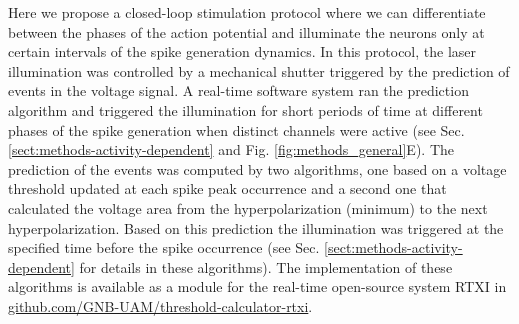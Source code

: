 Here we propose a closed-loop stimulation protocol where we can differentiate between the phases of the action potential and illuminate the neurons only at certain intervals of the spike generation dynamics. In this protocol, the laser illumination was controlled by a mechanical shutter triggered by the prediction of events in the voltage signal. A real-time software system ran the prediction algorithm and triggered the illumination for short periods of time at different phases of the spike generation when distinct channels were active (see Sec. \ref{sect:methods-activity-dependent} and Fig. \ref{fig:methods_general}E). The prediction of the events was computed by two algorithms, one based on a voltage threshold updated at each spike peak occurrence and a second one that calculated the voltage area from the hyperpolarization (minimum) to the next hyperpolarization. Based on this prediction the illumination was triggered at the specified time before the spike occurrence (see Sec. \ref{sect:methods-activity-dependent} for details in these algorithms). The implementation of these algorithms is available as a module for the real-time open-source system RTXI \parencite{patel_hard_2017} in \href{https://github.com/GNB-UAM/threshold-calculator-rtxi}{github.com/GNB-UAM/threshold-calculator-rtxi}.


